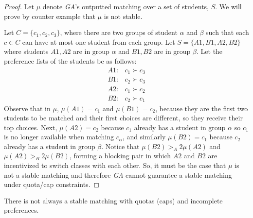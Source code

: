 \begin{proof}
  Let $\mu$ denote \textit{GA}'s outputted matching over a set of
  students, $S$. We will prove by counter example that $\mu$ is not stable.

  Let $C = \{ c_1, c_2, c_3 \}$, where there are two groups of student $\alpha$
  and $\beta$ such that each $c \in C$ can have at most one student from each
  group. Let $S = \{ A1, B1, A2, B2 \}$ where students $A1, A2$ are in group
  $\alpha$ and $B1, B2$ are in group $\beta$. Let the preference lists of the
  students be as follows: \[
    \begin{array}{ll} A1: & c_1 \succ c_3 \\ B1: &
             c_2 \succ c_3            \\ A2: & c_1 \succ c_2\\ B2: & c_2 \succ
                c_1
    \end{array}
  \] Observe that in $\mu$, $\mu(A1) = c_1$ and $\mu(B1) = c_2$,
  because they are the first two students to be matched and their first choices
  are different, so they receive their top choices. Next, $\mu(A2) = c_2$
  because $c_1$ already has a student in group $\alpha$ so $c_1$ is no longer
  available when matching $c_\alpha$, and similarly $\mu(B2) = c_1$ because
  $c_2$ already has a student in group $\beta$. Notice that $\mu(B2) >_A2
    \mu(A2)$ and $\mu(A2) >_B2 \mu(B2)$, forming a blocking pair in which $A2$ and
  $B2$ are incentivized to switch classes with each other. So, it must be the case
  that $\mu$ is not a stable matching and therefore \textit{GA} cannot guarantee a
  stable matching under quota/cap constraints.
\end{proof}

\begin{theorem}
  There is not always a stable matching with quotas (caps) and
  incomplete preferences.
\end{theorem}

